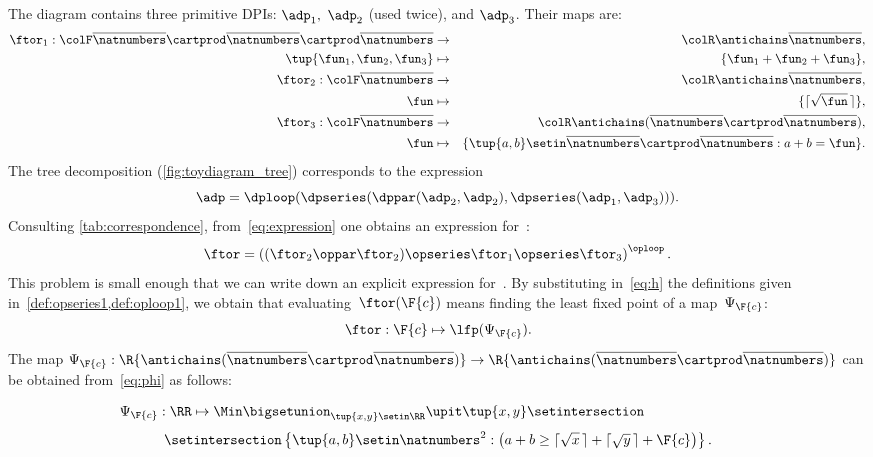 The diagram contains three primitive DPIs: $\adp_{1},$ $\adp_{2}$ (used twice), and $\adp_{3}$.
Their \ftor maps are:
\begin{eqnarray*}
    \ftor_{1}:{\colF\overline{\natnumbers}\cartprod\overline{\natnumbers}\cartprod\overline{\natnumbers}} & \rightarrow & {\colR\antichains\overline{\natnumbers}},\\
    \tup{ \fun_{1},\fun_{2},\fun_{3}}  & \mapsto & \{\fun_{1}+\fun_{2}+\fun_{3}\},\\
    \ftor_{2}:{\colF\overline{\natnumbers}} & \rightarrow & {\colR\antichains\overline{\natnumbers}},\\
    \fun& \mapsto & \{\lceil\sqrt{\fun}\,\rceil\},\\
    \ftor_{3}:{\colF\overline{\natnumbers}} & \rightarrow & {\colR\antichains(\overline{\natnumbers}\cartprod\overline{\natnumbers})},\\
    \fun& \mapsto & \{\tup{ a,b} \setin\overline{\natnumbers}\cartprod\overline{\natnumbers}:a+b=\fun\}.
\end{eqnarray*}
The tree decomposition (\cref{fig:toydiagram_tree}) corresponds to the expression
\begin{equation}
    \adp=\dploop(\dpseries(\dppar(\adp_{2},\adp_{2}),\dpseries(\adp_{1},\adp_{3}))).
    \label{eq:expression}
\end{equation}
Consulting \cref{tab:correspondence}, from~\cref{eq:expression} one obtains an expression for~\ftor:
\begin{equation}
    \ftor=\left((\ftor_{2}\oppar\ftor_{2})\opseries\ftor_{1}\opseries\ftor_{3}\right)^{\oploop}.
    \label{eq:h}
\end{equation}
This problem is small enough that we can write down an explicit expression for~\ftor.
By substituting in~\cref{eq:h} the definitions given in~\cref{def:opseries1,def:oploop1}, we obtain that evaluating~$\ftor(\F{c})$ means finding the least fixed point of a map~$\Psi_{\F{c}}$:
\begin{equation*}
    \ftor:\F{c}\mapsto\lfp(\Psi_{\F{c}}).
\end{equation*}
The map $\Psi_{\F{c}}:\R{\antichains(\overline{\natnumbers}\cartprod\overline{\natnumbers})}\rightarrow\R{\antichains(\overline{\natnumbers}\cartprod\overline{\natnumbers})}$ can be obtained from~\cref{eq:phi} as follows:

\begin{equation}
    \Psi_{\F{c}}:\RR\mapsto\Min\bigsetunion_{\tup{ x,y} \setin\RR}\upit\tup{ x,y} \setintersection\qquad\qquad\qquad\qquad
\end{equation}
%
\begin{equation}
    \setintersection\left\{ \tup{ a,b} \setin\natnumbers^{2}:\left(a+b\geq\lceil\sqrt{x}\,\rceil+\lceil\sqrt{y}\,\rceil+\F{c}\right)\right\}.
\end{equation}
%


